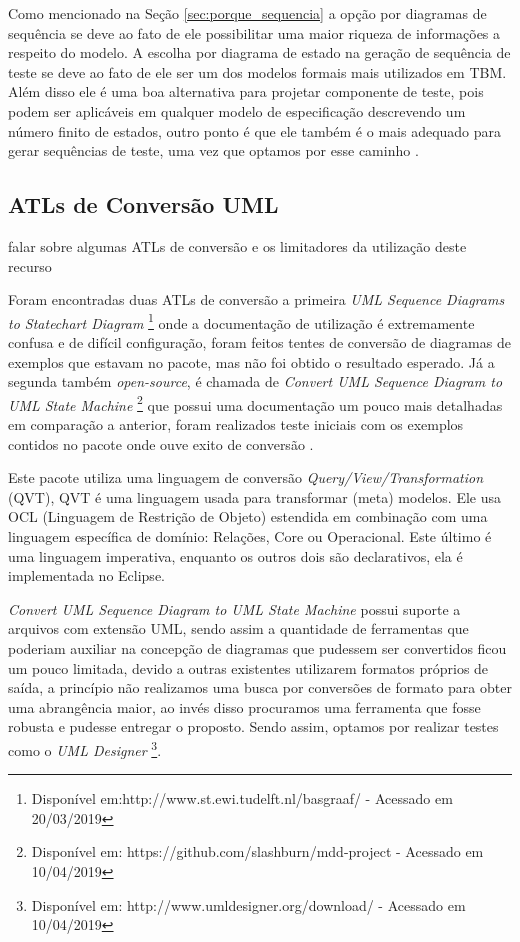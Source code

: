 Como mencionado na Seção \ref{sec:porque_sequencia} a opção por diagramas de sequência se deve ao fato de ele possibilitar uma maior riqueza de informações a respeito do modelo.
A escolha por diagrama de estado na geração de sequência de teste se deve ao fato de ele ser um dos modelos formais mais utilizados em TBM. Além disso ele é uma boa alternativa para projetar componente de teste, pois podem ser aplicáveis em qualquer modelo de especificação descrevendo um número finito de estados, outro ponto é que ele também é o mais adequado para gerar sequências de teste, uma vez que optamos por esse caminho \cite{costa2016split}.


\subsection{ATLs de Conversão UML}

falar sobre algumas ATLs de conversão e os limitadores da utilização deste recurso

Foram encontradas duas ATLs de conversão a primeira \textit{UML Sequence Diagrams to Statechart Diagram} \footnote[1]{Disponível em:http://www.st.ewi.tudelft.nl/basgraaf/ - Acessado em 20/03/2019} onde a documentação de utilização é extremamente confusa e de difícil configuração, foram feitos tentes de conversão de diagramas de exemplos que estavam no pacote, mas não foi obtido o resultado esperado. Já a segunda também \textit{open-source}, é chamada de \textit{Convert UML Sequence Diagram to UML State Machine} \footnote[1]{Disponível em: https://github.com/slashburn/mdd-project - Acessado em 10/04/2019} que possui uma documentação um pouco mais detalhadas em comparação a anterior, foram realizados teste iniciais com os exemplos contidos no pacote onde ouve exito de conversão \cite{hennicker2007activity}.

Este pacote utiliza uma linguagem de conversão \textit{Query/View/Transformation} (QVT), QVT é uma linguagem usada para transformar (meta) modelos. Ele usa OCL (Linguagem de Restrição de Objeto) estendida em combinação com uma linguagem específica de domínio: Relações, Core ou Operacional. Este último é uma linguagem imperativa, enquanto os outros dois são declarativos, ela é implementada no Eclipse.

\textit{Convert UML Sequence Diagram to UML State Machine} possui suporte a arquivos com extensão UML, sendo assim a quantidade de ferramentas que poderiam auxiliar na concepção de diagramas que pudessem ser convertidos ficou um pouco limitada, devido a outras existentes utilizarem formatos próprios de saída, a princípio não realizamos uma busca por conversões de formato para obter uma abrangência maior, ao invés disso procuramos uma ferramenta que fosse robusta e pudesse entregar o proposto. Sendo assim, optamos por realizar testes como o \textit{UML Designer}  \footnote[2]{Disponível em: http://www.umldesigner.org/download/ - Acessado em 10/04/2019}.

